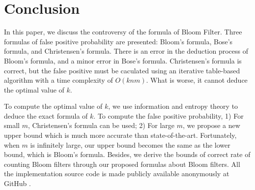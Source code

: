 \section{Conclusion}
\label{sec:conclusion}
In this paper, we discuss the controversy of the formula of Bloom Filter. Three formulas of false positive probability are presented: Bloom's formula, Bose's formula, and Christensen's formula. There is an error in the deduction process of Bloom's formula, and a minor error in Bose's formula. Christensen's formula is correct, but the false positive must be caculated using an iterative table-based algorithm with a time complexity of $O(knm)$. What is worse, it cannot deduce the optimal value of $k$.


To compute the optimal value of $k$, we use information and entropy theory to deduce the exact formula of $k$.
To compute the false positive probability, 1) For small $m$, Christensen's formula can be used; 2) For large $m$, we propose a new upper bound which is much more accurate than state-of-the-art. Fortunately, when $m$ is infinitely large, our upper bound becomes the same as the lower bound, which is Bloom's formula.
Besides, we derive the bounds of correct rate of counting Bloom filters through our proposed formulas about Bloom filters. 
All the implementation source code is made publicly available anonymously at GitHub \cite{opensource}.
\newpage
